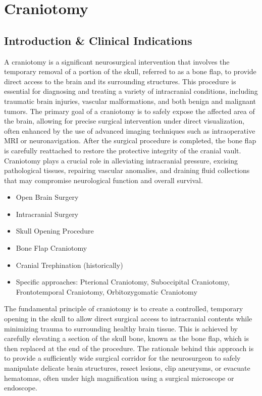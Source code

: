 \chapter{Craniotomy}

\section*{Introduction \& Clinical Indications}
A craniotomy is a significant neurosurgical intervention that involves the temporary removal of a portion of the skull, referred to as a bone flap, to provide direct access to the brain and its surrounding structures. This procedure is essential for diagnosing and treating a variety of intracranial conditions, including traumatic brain injuries, vascular malformations, and both benign and malignant tumors. The primary goal of a craniotomy is to safely expose the affected area of the brain, allowing for precise surgical intervention under direct visualization, often enhanced by the use of advanced imaging techniques such as intraoperative MRI or neuronavigation. After the surgical procedure is completed, the bone flap is carefully reattached to restore the protective integrity of the cranial vault. Craniotomy plays a crucial role in alleviating intracranial pressure, excising pathological tissues, repairing vascular anomalies, and draining fluid collections that may compromise neurological function and overall survival.

\begin{itemize}
  \item Open Brain Surgery
  \item Intracranial Surgery
  \item Skull Opening Procedure
  \item Bone Flap Craniotomy
  \item Cranial Trephination (historically)
  \item Specific approaches: Pterional Craniotomy, Suboccipital Craniotomy, Frontotemporal Craniotomy, Orbitozygomatic Craniotomy
\end{itemize}

The fundamental principle of craniotomy is to create a controlled, temporary opening in the skull to allow direct surgical access to intracranial contents while minimizing trauma to surrounding healthy brain tissue. This is achieved by carefully elevating a section of the skull bone, known as the bone flap, which is then replaced at the end of the procedure. The rationale behind this approach is to provide a sufficiently wide surgical corridor for the neurosurgeon to safely manipulate delicate brain structures, resect lesions, clip aneurysms, or evacuate hematomas, often under high magnification using a surgical microscope or endoscope.

